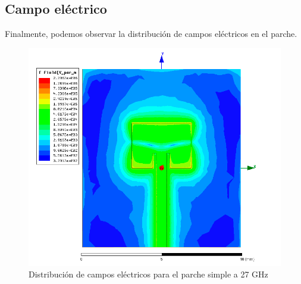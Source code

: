 \newpage
\subsection{Campo eléctrico}
\par Finalmente, podemos observar la distribución de campos eléctricos en el parche. 
\begin{figure}[H]
    \centering
        \includegraphics[width=\textwidth]{archivos/analisis/1x13/8}
        \caption{Distribución de campos eléctricos para el parche simple a 27 GHz}
        \label{fig:elec1x13}
\end{figure}


